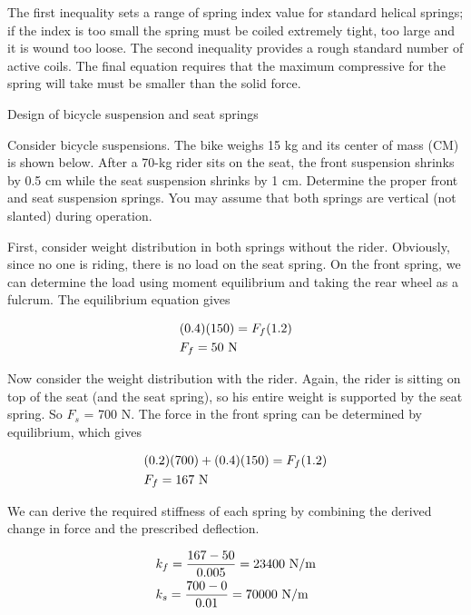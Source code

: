 \documentclass[a4paper,openany,12pt]{book}
\begin{document}
{{The first inequality sets a range of spring index value for standard
helical springs; if the index is too small the spring must be coiled
extremely tight, too large and it is wound too loose. The second
inequality provides a rough standard number of active coils. The final
equation requires that the maximum compressive for the spring will take
must be smaller than the solid force.

Design of bicycle suspension and seat springs

Consider bicycle suspensions. The bike weighs 15 kg and its center of
mass (CM) is shown below. After a 70-kg rider sits on the seat, the
front suspension shrinks by 0.5 cm while the seat suspension shrinks by
1 cm. Determine the proper front and seat suspension springs. You may
assume that both springs are vertical (not slanted) during operation.

First, consider weight distribution in both springs without the rider.
Obviously, since no one is riding, there is no load on the seat spring.
On the front spring, we can determine the load using moment equilibrium
and taking the rear wheel as a fulcrum. The equilibrium equation gives

$$\begin{gathered}
      (0.4)(150) = F_f(1.2) \hfill \\
      F_f = 50 \text{ N} \hfill \\ 
    \end{gathered}$$

Now consider the weight distribution with the rider. Again, the rider is
sitting on top of the seat (and the seat spring), so his entire weight
is supported by the seat spring. So \(F_s\) = 700 N. The force in the
front spring can be determined by equilibrium, which gives

$$\begin{gathered}
      (0.2)(700) + (0.4)(150) = F_f(1.2) \hfill \\
      F_f = 167 \text{ N} \hfill \\ 
    \end{gathered}$$

We can derive the required stiffness of each spring by combining the
derived change in force and the prescribed deflection.

$$\begin{gathered}
      k_f = \frac{167 - 50}{0.005} = 23400 \text{ N/m} \hfill \\
      k_s = \frac{700 - 0}{0.01} = 70000 \text{ N/m} \hfill \\ 
    \end{gathered}$$

}}
\end{document}
